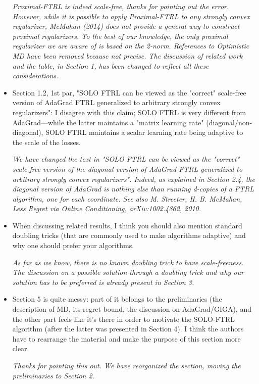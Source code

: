 \documentclass{article}
\begin{document}
\begin{itemize}
\emph{Proximal-FTRL is indeed scale-free, thanks for pointing out the error. However, while it is possible to apply Proximal-FTRL to any strongly convex regularizer, McMahan (2014) does not provide a general way to construct
proximal regularizers. To the best of our knowledge, the only proximal
regularizer we are aware of is based on the 2-norm.
References to Optimistic MD have been removed because not precise.
The discussion of related work and the
table, in Section 1, has been changed to reflect all these considerations.}

\item Section 1.2, 1st par, "SOLO FTRL can be viewed as the "correct" scale-free
version of AdaGrad FTRL generalized to arbitrary strongly convex regularizers":
I disagree with this claim; SOLO FTRL is very different from AdaGrad---while
the latter maintains a "matrix learning rate" (diagonal/non-diagonal), SOLO
FTRL maintains a scalar learning rate being adaptive to the scale of the
losses.

\emph{We have changed the text in "SOLO FTRL can be viewed as the "correct"
scale-free version of the diagonal version of AdaGrad FTRL generalized to
arbitrary strongly convex regularizers".  Indeed, as explained in Section 2.4,
the diagonal version of AdaGrad is nothing else than running d-copies of a FTRL
algorithm, one for each coordinate. See also M. Streeter, H. B. McMahan, Less
Regret via Online Conditioning, arXiv:1002.4862, 2010.}

\item When discussing related results, I think you should also mention standard
doubling tricks (that are commonly used to make algorithms adaptive) and why
one should prefer your algorithms.

\emph{As far as we know, there is no known doubling trick to have scale-freeness.
The discussion on a possible solution through a doubling trick and why our solution has to be preferred is already present in Section 3.}

\item Section 5 is quite messy: part of it belongs to the preliminaries (the
description of MD, its regret bound, the discussion on AdaGrad/GIGA), and the
other part feels like it's there in order to motivate the SOLO-FTRL algorithm
(after the latter was presented in Section 4).  I think the authors have to
rearrange the material and make the purpose of this section more clear.

\emph{Thanks for pointing this out. We have reorganized the section, moving the
  preliminaries to Section 2.}

\end{itemize}
  
\end{document}
